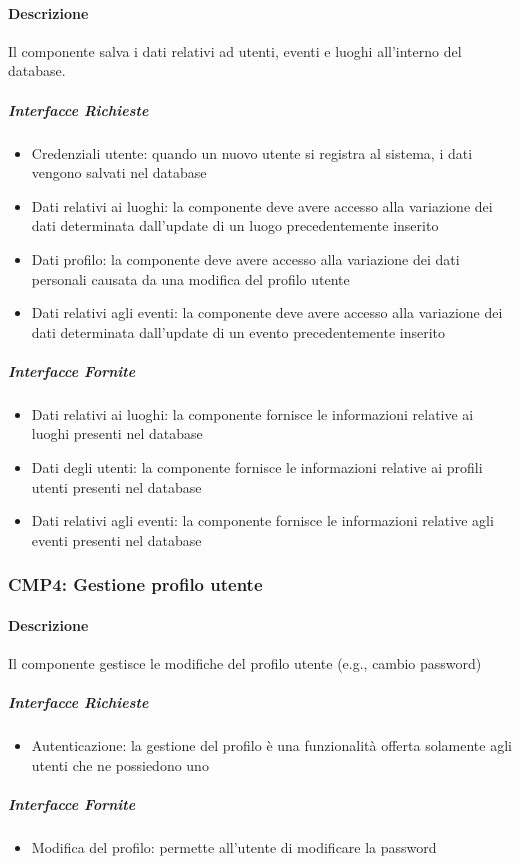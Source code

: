 \documentclass[9pt]{extarticle}
\begin{document}
\paragraph{Descrizione}
Il componente salva i dati relativi ad utenti, eventi e luoghi all'interno del database.
\subparagraph{Interfacce Richieste}
\begin{itemize}
	\item Credenziali utente: quando un nuovo utente si registra al sistema, i dati vengono salvati nel database
	\item Dati relativi ai luoghi: la componente deve avere accesso alla variazione dei dati determinata dall'update di un luogo precedentemente inserito
	\item Dati profilo: la componente deve avere accesso alla variazione dei dati personali causata da una modifica del profilo utente
	\item Dati relativi agli eventi: la componente deve avere accesso alla variazione dei dati determinata dall'update di un evento precedentemente inserito
\end{itemize}
\subparagraph{Interfacce Fornite}
\begin{itemize}
	\item Dati relativi ai luoghi: la componente fornisce le informazioni relative ai luoghi presenti nel database
	\item Dati degli utenti: la componente fornisce le informazioni relative ai profili utenti presenti nel database
	\item Dati relativi agli eventi: la componente fornisce le informazioni relative agli eventi presenti nel database
\end{itemize}


\subsubsection*{CMP4: Gestione profilo utente}
\paragraph{Descrizione}
Il componente gestisce le modifiche del profilo utente (e.g., cambio password)

\subparagraph{Interfacce Richieste}
\begin{itemize}
	\item Autenticazione: la gestione del profilo è una funzionalità offerta solamente agli utenti che ne possiedono uno
\end{itemize}
\subparagraph{Interfacce Fornite}
\begin{itemize}
	\item Modifica del profilo: permette all'utente di modificare la password
\end{itemize}
\end{document}

